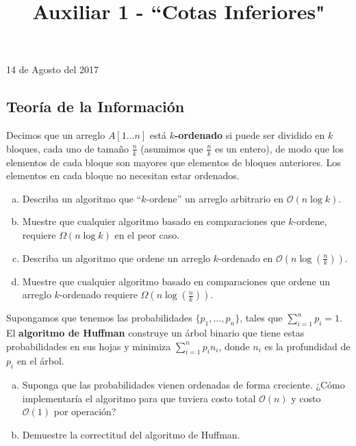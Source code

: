 \documentclass[dcc,uchile]{fcfmcourse}
\title{Auxiliar 1 - ``Cotas Inferiores"}
\theoremstyle{plain}
\theoremstyle{definition}
\begin{document}
\maketitle
\begin{center}
14 de Agosto del 2017
\end{center}


\vspace{-1ex}


\begin{problems}
\section*{Teoría de la Información}
\problem Decimos que un arreglo $A[1\ldots n]$ está \textbf{$k$-ordenado} si puede ser dividido en $k$ bloques, cada uno de tamaño $\frac{n}{k}$ (asumimos que $\frac{n}{k}$ es un entero), de modo que los elementos de cada bloque son mayores que elementos de bloques anteriores. Los elementos en cada bloque no necesitan estar ordenados.
\begin{enumerate}[a)]
    \item Describa un algoritmo que ``$k$-ordene'' un arreglo arbitrario en $\mathcal{O}(n\log k)$.
    \item Muestre que cualquier algoritmo basado en comparaciones que $k$-ordene, requiere $\Omega(n\log k)$ en el peor caso.
    \item Describa un algoritmo que ordene un arreglo $k$-ordenado en $\mathcal{O}\left(n\log\left(\frac{n}{k}\right)\right)$.
    \item Muestre que cualquier algoritmo basado en comparaciones que ordene un arreglo $k$-ordenado requiere $\Omega\left(n\log\left(\frac{n}{k}\right)\right)$.
\end{enumerate}
\problem Supongamos que tenemos las probabilidades $\{p_{1},\ldots, p_{n}\}$, tales que $\sum_{i=1}^n p_{i} = 1$. El \textbf{algoritmo de Huffman} construye un árbol binario que tiene estas probabilidades en sus hojas y minimiza $\sum_{i=1}^n p_{i}n_{i}$, donde $n_{i}$ es la profundidad de $p_{i}$ en el árbol.
\begin{enumerate}[a)]
\item Suponga que las probabilidades vienen ordenadas de forma creciente. ¿Cómo implementaría el algoritmo para que tuviera costo total $\mathcal{O}(n)$ y costo $\mathcal{O}(1)$ por operación?
\item Demuestre la correctitud del algoritmo de Huffman.
\end{enumerate}

\end{problems}
\end{document}
